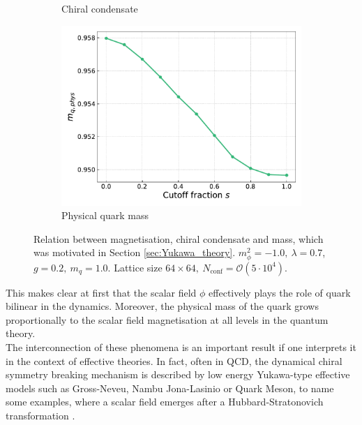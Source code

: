 \begin{figure}[]
\begin{subfigure}[b]{0.47\textwidth}
        \caption{Chiral condensate}
    \end{subfigure}
    \begin{subfigure}[b]{0.47\textwidth}
        \includegraphics[width=1.0\textwidth]{figures/slide_broken/mass.pdf}
        \caption{Physical quark mass}
    \end{subfigure}
    \caption[Relation between magnetisation, condensate and mass]{Relation between magnetisation, chiral condensate and mass, which was motivated in Section \ref{sec:Yukawa_theory}. $m_\phi^2=-1.0, \ \lambda=0.7$, $g=0.2, \ m_q = 1.0$. Lattice size $64 \times 64, \ N_\text{conf} = \mathcal{O}(5 \cdot 10^4)$.}
    \label{fig:interpolation_relation_phi_cond_mass}
\end{figure}
This makes clear at first that the scalar field $\phi$ effectively plays the role of quark bilinear in the dynamics. Moreover, the physical mass of the quark grows proportionally to the scalar field magnetisation at all levels in the quantum theory. \\
The interconnection of these phenomena is an important result if one interprets it in the context of effective theories. In fact, often in QCD, the dynamical chiral symmetry breaking mechanism is described by low energy Yukawa-type effective models such as Gross-Neveu, Nambu \textendash{} Jona-Lasinio or Quark Meson, to name some examples, where a scalar field emerges after a Hubbard-Stratonovich transformation \cite{hubbard}. \\
